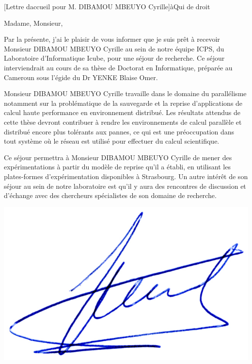 \documentclass[a4paper,10pt]{article}
\begin{document}
\begin{letter}[Lettre daccueil pour M. DIBAMOU MBEUYO Cyrille]{à}{Qui de droit}


    Madame, Monsieur,



     Par  la présente,  j'ai le  plaisir de  vous informer  que je  suis prêt  à
     recevoir Monsieur DIBAMOU  MBEUYO Cyrille au sein de notre  équipe ICPS, du
     Laboratoire d'Informatique Icube,  pour une séjour de  recherche. Ce séjour
     interviendrait au cours  de sa thèse de Doctorat  en Informatique, préparée
     au Cameroun sous l’égide du Dr YENKE Blaise Omer.

      Monsieur DIBAMOU MBEUYO Cyrille travaille  dans le domaine du parallélisme
      notamment  sur   la  problématique   de  la   sauvegarde  et   la  reprise
      d’applications de calcul haute performance en environnement distribué. Les
      résultats  attendus  de  cette  thèse  devront  contribuer  à  rendre  les
      environnements de calcul parallèle et  distribué encore plus tolérants aux
      pannes, ce  qui est une préoccupation  dans tout système où  le réseau est
      utilisé pour effectuer du calcul scientifique.

      Ce  séjour  permettra à  Monsieur  DIBAMOU  MBEUYO  Cyrille de  mener  des
      expérimentations  à  partir  du  modèle  de reprise  qu’il  a  établi,  en
      utilisant les plates-formes d'expérimentation disponibles à Strasbourg. Un
      autre intérêt de son séjour au sein  de notre laboratoire est qu’il y aura
      des rencontres de discussion et d’échange avec des chercheurs spécialistes
      de son domaine de recherche.

\end{letter}
\begin{flushright}
\includegraphics[width=.2\textwidth]{signgenaud.jpg}
\end{flushright}
\end{document}
